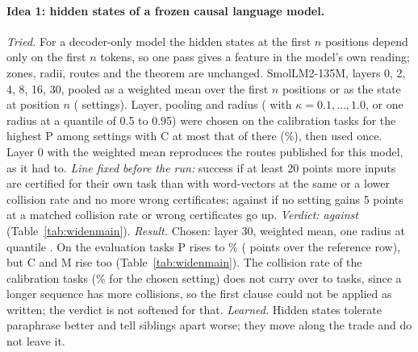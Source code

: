\paragraph{Idea 1: hidden states of a frozen causal language model.} \emph{Tried.} For a decoder-only model the hidden states at the first $n$ positions depend only on the first $n$ tokens, so one pass gives a feature in the model's own reading; zones, radii, routes and the theorem are unchanged. SmolLM2-135M, layers 0, 2, 4, 8, 16, 30, pooled as a weighted mean over the first $n$ positions or as the state at position $n$ (\WidenFeatSettings{} settings). Layer, pooling and radius (\cert{} with $\kappa = 0.1, \dots, 1.0$, or one radius at a quantile of 0.5 to 0.95) were chosen on the calibration tasks for the highest \textsf{P} among settings with \textsf{C} at most that of \cert{} there (\WidenFeatCalRefC{}\%), then used once. Layer 0 with the weighted mean reproduces the routes published for this model, as it had to.
\emph{Line fixed before the run:} success if at least 20 points more inputs are certified for their own task than with word-vectors at the same or a lower collision rate and no more wrong certificates; against if no setting gains 5 points at a matched collision rate or wrong certificates go up. \emph{Verdict: against} (Table~\ref{tab:widenmain}).
\emph{Result.} Chosen: layer 30, weighted mean, one radius at quantile \WidenFeatRadiusQuantile{}. On the evaluation tasks \textsf{P} rises to \WidenFeatP{}\% (\WidenFeatGain{} points over the reference row), but \textsf{C} and \textsf{M} rise too (Table~\ref{tab:widenmain}). The collision rate of the calibration tasks (\WidenFeatCalC{}\% for the chosen setting) does not carry over to \WidenTasksEval{} tasks, since a longer sequence has more collisions, so the first clause could not be applied as written; the verdict is not softened for that.
\emph{Learned.} Hidden states tolerate paraphrase better and tell siblings apart worse; they move along the trade and do not leave it.

